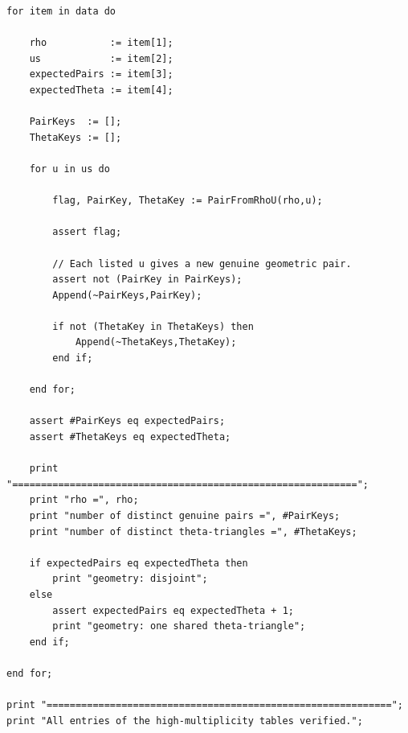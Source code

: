\documentclass[11pt]{amsart}
\theoremstyle{plain}
\theoremstyle{remark}
\theoremstyle{plain}
\begin{document}
\begin{verbatim}
for item in data do

    rho           := item[1];
    us            := item[2];
    expectedPairs := item[3];
    expectedTheta := item[4];

    PairKeys  := [];
    ThetaKeys := [];

    for u in us do

        flag, PairKey, ThetaKey := PairFromRhoU(rho,u);

        assert flag;

        // Each listed u gives a new genuine geometric pair.
        assert not (PairKey in PairKeys);
        Append(~PairKeys,PairKey);

        if not (ThetaKey in ThetaKeys) then
            Append(~ThetaKeys,ThetaKey);
        end if;

    end for;

    assert #PairKeys eq expectedPairs;
    assert #ThetaKeys eq expectedTheta;

    print "============================================================";
    print "rho =", rho;
    print "number of distinct genuine pairs =", #PairKeys;
    print "number of distinct theta-triangles =", #ThetaKeys;

    if expectedPairs eq expectedTheta then
        print "geometry: disjoint";
    else
        assert expectedPairs eq expectedTheta + 1;
        print "geometry: one shared theta-triangle";
    end if;

end for;

print "============================================================";
print "All entries of the high-multiplicity tables verified.";
\end{verbatim}







\end{document}
